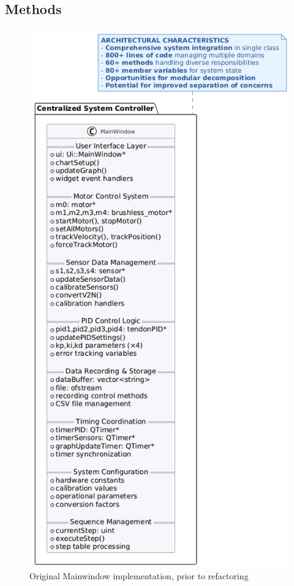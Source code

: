 \subsection{Methods}
\begin{figure}
    \centering
    \includegraphics[width=\linewidth]{images/Software documentation/old code/mainwindow.png}
    \caption{Original Mainwindow implementation, prior to refactoring}
    \label{fig:oldmainwindow}
\end{figure}
